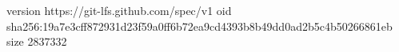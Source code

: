 version https://git-lfs.github.com/spec/v1
oid sha256:19a7e3cff872931d23f59a0ff6b72ea9cd4393b8b49dd0ad2b5c4b50266861eb
size 2837332
